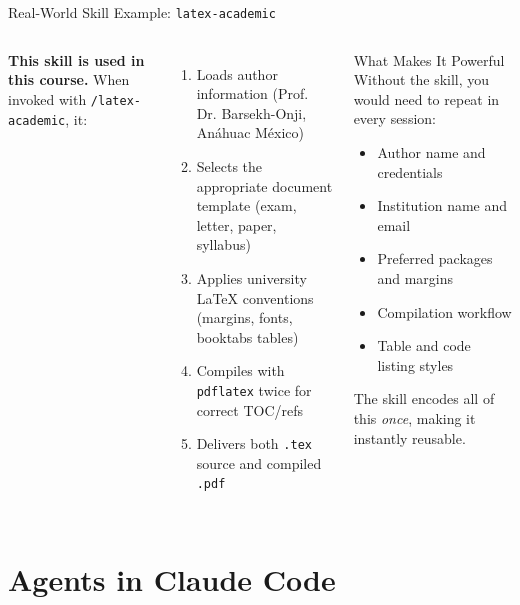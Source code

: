 \documentclass[aspectratio=169,xcolor=dvipsnames]{beamer}
\begin{document}
\begin{frame}{Real-World Skill Example: \texttt{latex-academic}}
    \begin{columns}
        \textbf{This skill is used in this course.} When invoked with \texttt{/latex-academic}, it:
        \vspace{0.2cm}
        \begin{enumerate}
            \item Loads author information (Prof. Dr. Barsekh-Onji, Anáhuac México)
            \item Selects the appropriate document template (exam, letter, paper, syllabus)
            \item Applies university LaTeX conventions (margins, fonts, booktabs tables)
            \item Compiles with \texttt{pdflatex} twice for correct TOC/refs
            \item Delivers both \texttt{.tex} source and compiled \texttt{.pdf}
        \end{enumerate}

        \begin{block}{What Makes It Powerful}
            Without the skill, you would need to repeat in every session:
            \begin{itemize}
                \item Author name and credentials
                \item Institution name and email
                \item Preferred packages and margins
                \item Compilation workflow
                \item Table and code listing styles
            \end{itemize}
            The skill encodes all of this \emph{once}, making it instantly reusable.
        \end{block}
    \end{columns}
\end{frame}

\section{Agents in Claude Code}
\end{document}
